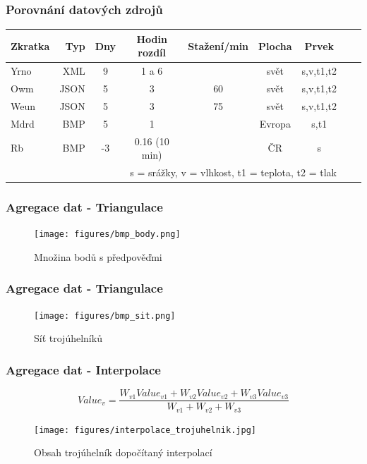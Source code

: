 \documentclass{beamer}
\begin{document}
	\begin{frame}
		\frametitle{Porovnání datových zdrojů}
		
		\begin{tabular} {l r c c c c c c c}
			
			Zkratka & Typ & Dny & Hodin rozdíl & Stažení/min & Plocha & Prvek \\
			\hline
			Yrno & XML & 9 & 1 a 6 & & svět & s,v,t1,t2 \\ 
			Owm & JSON & 5 & 3 & 60 & svět & s,v,t1,t2 \\ 
			Weun & JSON & 5 & 3 & 75 & svět & s,v,t1,t2 \\ 
			Mdrd & BMP & 5 & 1 &  & Evropa & s,t1 \\ 
			Rb & BMP & -3 & 0.16 (10 min)& & ČR & s \\ 
			\multicolumn{7}{r}{\footnotesize *s = srážky, v = vlhkost, t1 = teplota, t2 = tlak}\\
		\end{tabular}
	\end{frame}

	\begin{frame}
		\frametitle{Agregace dat - Triangulace}
		
		\begin{figure}
			
			\texttt{[image: figures/bmp\_body.png]}
			\caption{Množina bodů s předpověďmi}
			
		\end{figure}
	
	\end{frame}

	\begin{frame}
		\frametitle{Agregace dat - Triangulace}
		
		\begin{figure}
			
			\texttt{[image: figures/bmp\_sit.png]}
			\caption{Síť trojúhelníků}
			
		\end{figure}
		
	\end{frame}
	
	\begin{frame}
		\frametitle{Agregace dat - Interpolace}
		
		\begin{displaymath}
			Value_v = \frac{W_{v1}Value_{v1} + W_{v2}Value_{v2} + W_{v3}Value_{v3}}{W_{v1} + W_{v2} + W_{v3}}
		\end{displaymath}
		
		\begin{figure}
			
			\texttt{[image: figures/interpolace\_trojuhelnik.jpg]}
			\caption{Obsah trojúhelník dopočítaný interpolací \cite{coltrian}}
			
		\end{figure}
		
	\end{frame}
	
\end{document}
